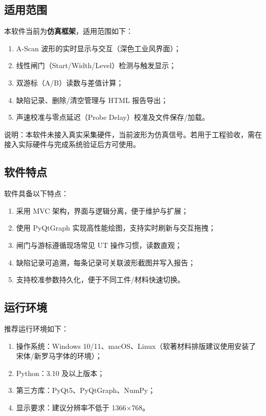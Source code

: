\subsection{适用范围}
\par
本软件当前为\textbf{仿真框架}，适用范围如下：
\begin{enumerate}
	\item A-Scan 波形的实时显示与交互（深色工业风界面）；
	\item 线性闸门（Start/Width/Level）检测与触发显示；
	\item 双游标（A/B）读数与差值计算；
	\item 缺陷记录、删除/清空管理与 HTML 报告导出；
	\item 声速校准与零点延迟（Probe Delay）校准及文件保存/加载。
\end{enumerate}
\par
说明：本软件未接入真实采集硬件，当前波形为仿真信号。若用于工程验收，需在接入实际硬件与完成系统验证后方可使用。

\subsection{软件特点}
\par
软件具备以下特点：
\begin{enumerate}
	\item 采用 MVC 架构，界面与逻辑分离，便于维护与扩展；
	\item 使用 PyQtGraph 实现高性能绘图，支持实时刷新与交互拖拽；
	\item 闸门与游标遵循现场常见 UT 操作习惯，读数直观；
	\item 缺陷记录可追溯，每条记录可关联波形截图并写入报告；
	\item 支持校准参数持久化，便于不同工件/材料快速切换。
\end{enumerate}

\subsection{运行环境}
\par
推荐运行环境如下：
\begin{enumerate}
	\item 操作系统：Windows 10/11、macOS、Linux（软著材料排版建议使用安装了宋体/新罗马字体的环境）；
	\item Python：3.10 及以上版本；
	\item 第三方库：PyQt5、PyQtGraph、NumPy；
	\item 显示要求：建议分辨率不低于 1366$\times$768。
\end{enumerate}

